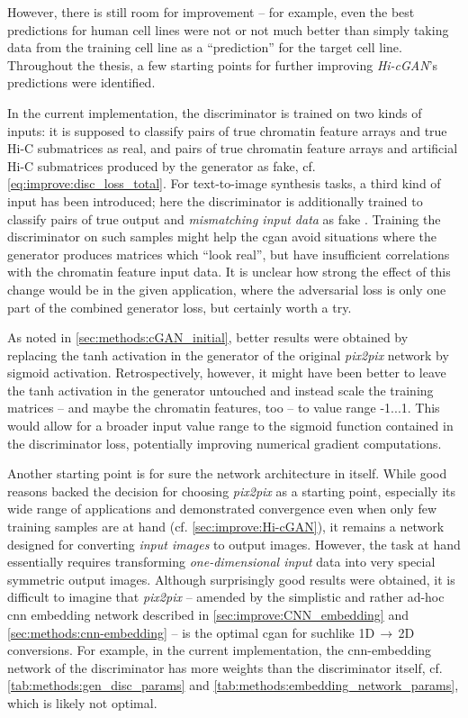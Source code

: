 However, there is still room for improvement -- for example, even the best predictions for human cell lines were not or not much better 
than simply taking data from the training cell line as a ``prediction'' for the target cell line.
Throughout the thesis, a few starting points for further improving \emph{Hi-cGAN}'s predictions were identified.

In the current implementation, the discriminator is trained on two kinds of inputs:
it is supposed to classify pairs of true chromatin feature arrays and true Hi-C submatrices as real, 
and pairs of true chromatin feature arrays and artificial Hi-C submatrices produced by the generator as fake, cf. \cref{eq:improve:disc_loss_total}.
For text-to-image synthesis tasks, a third kind of input has been introduced; here the discriminator is additionally trained 
to classify pairs of true output and \emph{mismatching input data} as fake \cite{Reed2016}.
Training the discriminator on such samples might help the \acrshort{cgan} avoid situations 
where the generator produces matrices which ``look real'', 
but have insufficient correlations with the chromatin feature input data.
It is unclear how strong the effect of this change would be in the given application, 
where the adversarial loss is only one part of the combined generator loss, but certainly worth a try.

As noted in \cref{sec:methods:cGAN_initial}, better results were obtained by replacing the tanh activation in the generator 
of the original \emph{pix2pix} network by sigmoid activation.
Retrospectively, however, it might have been better to leave the tanh activation in the generator untouched
and instead scale the training matrices -- and maybe the chromatin features, too -- to value range -1...1.
This would allow for a broader input value range to the sigmoid function contained in the discriminator loss,
potentially improving numerical gradient computations.

Another starting point is for sure the network architecture in itself.
While good reasons backed the decision for choosing \emph{pix2pix} as a starting point,
especially its wide range of applications and demonstrated convergence even when only few training 
samples are at hand \cite{Isola2017} (cf. \cref{sec:improve:Hi-cGAN}),
it remains a network designed for converting \emph{input images} to output images.
However, the task at hand essentially requires transforming \emph{one-dimensional input} data into very special symmetric output images.
Although surprisingly good results were obtained, it is difficult to imagine that \emph{pix2pix} -- amended by the simplistic and rather ad-hoc \acrshort{cnn} embedding network 
described in \cref{sec:improve:CNN_embedding} and \ref{sec:methods:cnn-embedding} -- is the optimal \acrshort{cgan} for suchlike 1D\,$\rightarrow$\,2D conversions.
For example, in the current implementation, the \acrshort{cnn}-embedding network of the discriminator has more weights than the discriminator itself, 
cf. \cref{tab:methods:gen_disc_params} and \ref{tab:methods:embedding_network_params}, which is likely not optimal.

